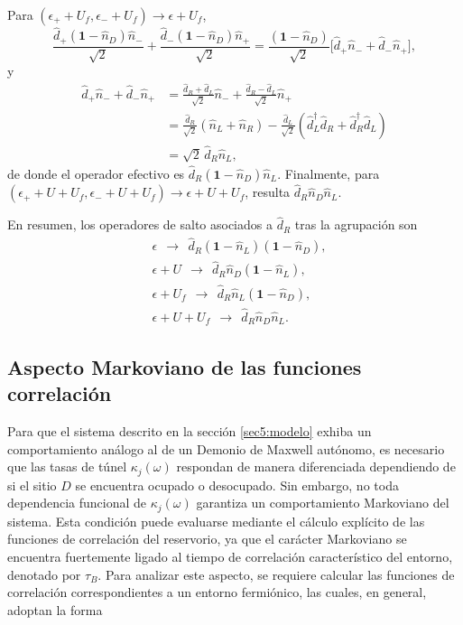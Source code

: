 \begin{appendixs}
Para \((\epsilon_{+}+U_{f},\epsilon_{-}+U_{f})\to \epsilon+U_{f}\),
\[
\frac{\hat{d}_{+}(\mathbf{1}-\hat{n}_{D})\hat{n}_{-}}{\sqrt{2}}
+\frac{\hat{d}_{-}(\mathbf{1}-\hat{n}_{D})\hat{n}_{+}}{\sqrt{2}}
=\frac{(\mathbf{1}-\hat{n}_{D})}{\sqrt{2}}\big[\hat{d}_{+}\hat{n}_{-}+\hat{d}_{-}\hat{n}_{+}\big],
\]
y
\begin{align*}
\hat{d}_{+}\hat{n}_{-}+\hat{d}_{-}\hat{n}_{+}
&=\frac{\hat{d}_{R}+\hat{d}_{L}}{\sqrt{2}}\hat{n}_{-}
+\frac{\hat{d}_{R}-\hat{d}_{L}}{\sqrt{2}}\hat{n}_{+}\\
&=\frac{\hat{d}_{R}}{\sqrt{2}}(\hat{n}_{L}+\hat{n}_{R})
-\frac{\hat{d}_{L}}{\sqrt{2}}(\hat{d}^{\dagger}_{L}\hat{d}_{R}+\hat{d}^{\dagger}_{R}\hat{d}_{L})\\
&=\sqrt{2}\,\hat{d}_{R}\hat{n}_{L},
\end{align*}
de donde el operador efectivo es \(\hat{d}_{R}(\mathbf{1}-\hat{n}_{D})\hat{n}_{L}\). Finalmente, para
\((\epsilon_{+}+U+U_{f},\epsilon_{-}+U+U_{f})\to \epsilon+U+U_{f}\), resulta
\(\hat{d}_{R}\hat{n}_{D}\hat{n}_{L}\).

En resumen, los operadores de salto asociados a \(\hat{d}_{R}\) tras la agrupación son
\begin{align*}
&\epsilon \ \ \to\ \ \hat{d}_{R}(\mathbf{1}-\hat{n}_{L})(\mathbf{1}-\hat{n}_{D}),\\
&\epsilon+U \ \ \to\ \ \hat{d}_{R}\hat{n}_{D}(\mathbf{1}-\hat{n}_{L}),\\
&\epsilon+U_{f} \ \ \to\ \ \hat{d}_{R}\hat{n}_{L}(\mathbf{1}-\hat{n}_{D}),\\
&\epsilon+U+U_{f} \ \ \to\ \ \hat{d}_{R}\hat{n}_{D}\hat{n}_{L}.
\end{align*}




\subsection{Aspecto Markoviano de las funciones correlación}
Para que el sistema descrito en la sección \ref{sec5:modelo} exhiba un comportamiento análogo al de un Demonio de Maxwell autónomo, es necesario que las tasas de túnel $\kappa_{j}(\omega)$ respondan de manera diferenciada dependiendo de si el sitio $D$ se encuentra ocupado o desocupado. Sin embargo, no toda dependencia funcional de $\kappa_{j}(\omega)$ garantiza un comportamiento Markoviano del sistema. Esta condición puede evaluarse mediante el cálculo explícito de las funciones de correlación del reservorio, ya que el carácter Markoviano se encuentra fuertemente ligado al tiempo de correlación característico del entorno, denotado por $\tau_{B}$. Para analizar este aspecto, se requiere calcular las funciones de correlación correspondientes a un entorno fermiónico, las cuales, en general, adoptan la forma


\end{appendixs}
